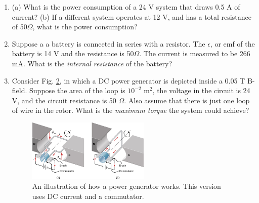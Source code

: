 \documentclass[10pt]{article}
\begin{document}
\begin{enumerate}
\begin{figure}
\caption{\label{fig:nerve} A nerve signal in the human body.}
\end{figure}
Suppose an ion with the charge of an electron is accelerated by the positive 50 mV of the nerve signal potential shown in Fig. \ref{fig:nerve} for 1 ms.  (a) What is the final energy of the ion?  (b) What current does this represent?  (c) Suppose there are $10^{23}$ ions moving in the same way.  What current does this represent? (d) Suppose the cell wall is 50 nm thick.  What is the electric field across it, if the potential difference is the maximum in Fig. \ref{fig:nerve} minus the minumum in Fig. \ref{fig:nerve}? \\ \vspace{3cm}
\item (a) What is the power consumption of a 24 V system that draws 0.5 A of current? (b) If a different system operates at 12 V, and has a total resistance of 50$\Omega$, what is the power consumption? \\ \vspace{1cm}
\item Suppose a a battery is connceted in series with a resistor.  The $\epsilon$, or emf of the battery is 14 V and the resistance is 50$\Omega$.  The current is measured to be 266 mA.  What is the \textit{internal resistance} of the battery? \\ \vspace{1.5cm}
\item Consider Fig. \ref{fig:lorentz}, in which a DC power generator is depicted inside a 0.05 T B-field.  Suppose the area of the loop is $10^{-2}$ m$^{2}$, the voltage in the circuit is 24 V, and the circuit resistance is 50 $\Omega$.  Also assume that there is just one loop of wire in the rotor.  What is the \textit{maximum torque} the system could achieve? \\ \vspace{2cm}
\begin{figure}[ht]
\centering
\includegraphics[width=0.55\textwidth]{commute.jpeg}
\caption{\label{fig:lorentz} An illustration of how a power generator works.  This version uses DC current and a commutator.}
\end{figure}

\end{enumerate}
\end{document}

